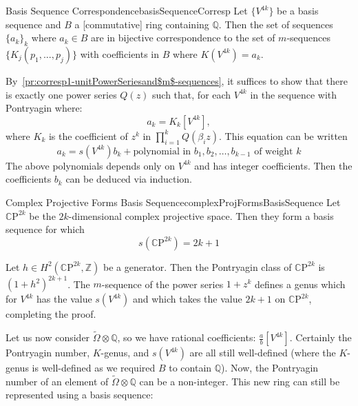 \documentclass{book}
\newenvironment{Proof}[1][]
  {\begin{ProofTcb}[#1]}
  {\end{ProofTcb}}
\newcommand{\Q}{{\mathbb{Q}}}
\newcommand{\CP}{{\mathbb{C}\mathrm{P}}}
\begin{document}
\begin{thm}{Basis Sequence Correspondence}{basisSequenceCorresp}
  Let $\{V^{4k}\}$ be a basis sequence and $B$ a [commutative] ring containing $\Q$. Then the set of sequences
  $\{a_k\}_k$ where $a_k \in B$ are in bijective correspondence to the set of $m$-sequences $\{K_j(p_1, ...,
  p_j)\}$ with coefficients in $B$ where $K(V^{4k}) = a_k$.
\end{thm}

\begin{Proof}
  By~\cref{pr:corresp1-unitPowerSeriesand$m$-sequences}, it suffices to show that there is exactly one power
  series $Q(z)$ such that, for each $V^{4k}$ in the sequence with Pontryagin where:
    \[
    a_k = K_k[V^{4k}],
    \]
    where $K_k$ is the coefficient of $z^k$ in $\prod_{i=1}^k Q(\beta_i z)$. This equation can be written
    \[
    a_k = s(V^{4k})b_k + \text{polynomial in } b_1, b_2, \ldots, b_{k-1} \text{ of weight } k
    \]
    The above polynomials depends only on $V^{4k}$ and has integer coefficients. Then the coefficients $b_k$
    can be deduced via induction.
  \end{Proof}


\begin{thm}{Complex Projective Forms Basis Sequence}{complexProjFormsBasisSequence}
  Let $\CP^{2k}$ be the $2k$-dimensional complex projective space. Then they form a basis sequence for which
  \[
    s(\CP^{2k}) = 2k+1
  \]
\end{thm}

\begin{Proof}
  Let $h \in H^2(\CP^{2k}, \mathbb{Z})$ be a generator. Then the Pontryagin class of
  $\CP^{2k}$ is $(1 + h^2)^{2k+1}$. The $m$-sequence of the power series $1 + z^k$ defines a genus which for
  $V^{4k}$ has the value $s(V^{4k})$ and which takes the value $2k + 1$ on $\CP^{2k}$, completing the proof.
\end{Proof}

Let us now consider $\widetilde{\Omega}\otimes \Q$, so we have rational coefficients: $\frac{a}{b}[V^{4k}]$.
Certainly the Pontryagin number, $K$-genus, and $s(V^{4k})$ are all still well-defined (where the $K$-genus is
well-defined as we required $B$ to contain $\Q$). Now, the Pontryagin number of an element of
$\widetilde{\Omega}\otimes \Q$ can be a non-integer. This new ring can still be represented using a basis
sequence:
\end{document}
